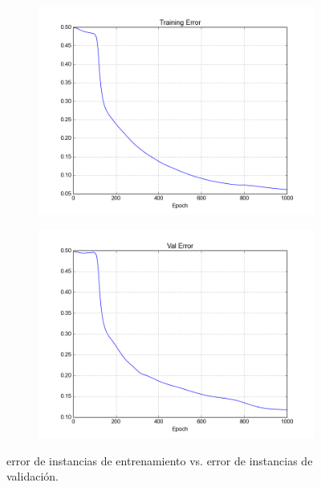 \begin{figure}[h]	
	\begin{subfigure}[b]{0.5\textwidth}
		\includegraphics[width=\linewidth]{fig/trainingerror_lr0,005_eps0,05_regparam0,00_beta5_batch1.png}
	\end{subfigure}
	\begin{subfigure}[b]{0.5\textwidth}
		\includegraphics[width=\linewidth]{fig/valerror_lr0,005_eps0,05_regparam0,00_beta5_batch1.png}
	\end{subfigure}

	\caption{error de instancias de entrenamiento vs. error de instancias de validación.}
\end{figure}


